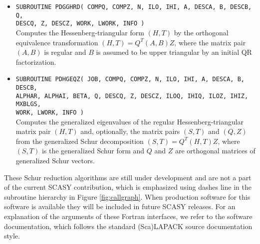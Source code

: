 \documentclass[11pt]{article}
\begin{document}
\begin{itemize}
\item \texttt{SUBROUTINE PDGGHRD( COMPQ, COMPZ, N, ILO, IHI, A,
DESCA, B, DESCB, Q, \\ DESCQ, Z, DESCZ, WORK, LWORK, INFO )} \\
Computes the Hessenberg-triangular form $(H,T)$ by the orthogonal
equivalence transformation $(H,T) = Q^T(A,B)Z$, where the matrix
pair $(A,B)$ is regular and $B$ is assumed to be upper triangular
by an initial QR factorization.

\item \texttt{SUBROUTINE PDHGEQZ( JOB, COMPQ, COMPZ, N, ILO, IHI,
A, DESCA, B, DESCB, \\ ALPHAR, ALPHAI, BETA, Q, DESCQ, Z, DESCZ,
ILOQ, IHIQ, ILOZ, IHIZ, MXBLGS, \\ WORK, LWORK, INFO )} \\
Computes the generalized eigenvalues of the regular
Hessenberg-triangular matrix pair $(H,T)$ and, optionally, the
matrix pairs $(S,T)$ and $(Q,Z)$ from the generalized Schur
decomposition $(S,T) = Q^T(H,T) Z$, where $(S,T)$ is the
generalized Schur form and $Q$ and $Z$ are orthogonal matrices of
generalized Schur vectors.
\end{itemize}

These Schur reduction algorithms are still under development and
are not a part of the current SCASY contribution, which is
emphasized using dashes line in the subroutine hierarchy in Figure
\ref{fig:callgraph}. When production software for this software is
available they will be included in future SCASY releases. For an
explanation of the arguments of these Fortran interfaces, we refer
to the software documentation, which follows the standard
(Sca)LAPACK source documentation style.
\end{document}
